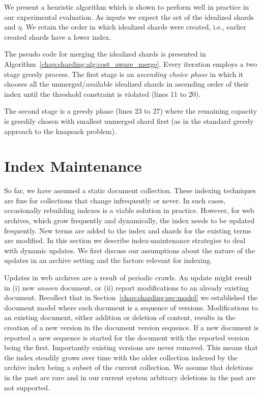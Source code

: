 We present a heuristic algorithm which is shown to perform well in
practice in our experimental evaluation. As inputs we expect the set
of the idealized shards and $\eta$. We retain the order
in which idealized shards were created, i.e., earlier created shards
have a lower index.

The pseudo code for merging the idealized shards is presented in
Algorithm~\ref{chap:sharding:alg:cost_aware_merge}. Every iteration employs a two
stage greedy process. The first stage is an \emph{ascending choice
  phase} in which it chooses all the unmerged/available idealized
shards in ascending order of their index until the threshold
constraint is violated (lines 11 to 20).

The second stage is a greedy phase (lines 23 to 27) where the
remaining capacity is greedily chosen with smallest unmerged shard
first (as in the standard greedy approach to the knapsack problem).

\section{Index Maintenance}
\label{chap:sharding:sec:maintenance}
So far, we have assumed a static document collection. These indexing techniques are fine for collections that change infrequently or never. In such cases, occasionally rebuilding indexes is a viable solution in practice. However, for web archives, which grow frequently and dynamically, the index needs to be updated frequently. New terms are added to the index and shards for the existing terms are modified. In this section we describe index-maintenance strategies to deal with dynamic updates. We first discuss our assumptions about the nature of the updates in an archive setting and the factors relevant for indexing.


Updates in web archives are a result of periodic crawls. An update might result in (i) new \emph{unseen} document, or (ii) report  modifications to an already existing document. Recollect that in Section~\ref{chap:sharding:sec:model} we established the document model where each document is a sequence of versions. Modifications to an existing document, either addition or deletion of content, results in the creation of a new version in the document version sequence. If a new document is reported a new sequence is started for the document with the reported version being the first. Importantly existing versions are never removed. This means that the index steadily grows over time with the older collection indexed by the archive index being a subset of the current collection. We assume that deletions in the past are rare and in our current system arbitrary deletions in the past are not supported.

